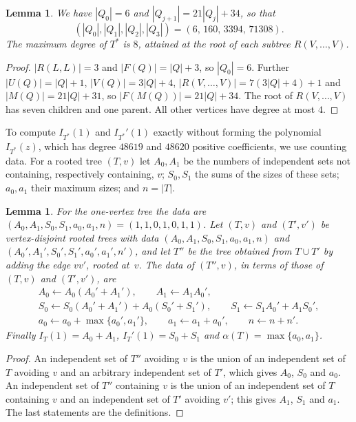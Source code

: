 \documentclass{amsart}
\numberwithin{equation}{section}
\theoremstyle{plain}
\newtheorem{lemma}[theorem]{Lemma}
\theoremstyle{definition}
\theoremstyle{remark}
\begin{document}
\begin{lemma}\label{lem:witnessshape}
We have $|Q_0|=6$ and $|Q_{j+1}|=21|Q_j|+34$, so that
\[
(|Q_0|,|Q_1|,|Q_2|,|Q_3|)=(6,\,160,\,3394,\,71308).
\]
The maximum degree of $T^*$ is $8$, attained at the root of each subtree $R(V,\dots,V)$.
\end{lemma}

\begin{proof}
$|R(L,L)|=3$ and $|F(Q)|=|Q|+3$, so $|Q_0|=6$. Further $|U(Q)|=|Q|+1$, $|V(Q)|=3|Q|+4$, $|R(V,\dots,V)|=7(3|Q|+4)+1$ and $|M(Q)|=21|Q|+31$, so $|F(M(Q))|=21|Q|+34$. The root of $R(V,\dots,V)$ has seven children and one parent. All other vertices have degree at most $4$.
\end{proof}

To compute $I_{T^*}(1)$ and $I_{T^*}'(1)$ exactly without forming the polynomial $I_{T^*}(z)$, which has degree $48619$ and $48620$ positive coefficients, we use counting data. For a rooted tree $(T,v)$ let $A_0,A_1$ be the numbers of independent sets not containing, respectively containing, $v$; $S_0,S_1$ the sums of the sizes of these sets; $a_0,a_1$ their maximum sizes; and $n=|T|$.

\begin{lemma}\label{lem:counting}
For the one-vertex tree the data are $(A_0,A_1,S_0,S_1,a_0,a_1,n)=(1,1,0,1,0,1,1)$. Let $(T,v)$ and $(T',v')$ be vertex-disjoint rooted trees with data $(A_0,A_1,S_0,S_1,a_0,a_1,n)$ and $(A_0',A_1',S_0',S_1',a_0',a_1',n')$, and let $T''$ be the tree obtained from $T\cup T'$ by adding the edge $vv'$, rooted at~$v$. The data of $(T'',v)$, in terms of those of $(T,v)$ and $(T',v')$, are
\begin{equation}\label{eq:counting}
\begin{gathered}
A_0\leftarrow A_0(A_0'+A_1'),\qquad A_1\leftarrow A_1A_0',\\
S_0\leftarrow S_0(A_0'+A_1')+A_0(S_0'+S_1'),\qquad S_1\leftarrow S_1A_0'+A_1S_0',\\
a_0\leftarrow a_0+\max\{a_0',a_1'\},\qquad a_1\leftarrow a_1+a_0',\qquad n\leftarrow n+n'.
\end{gathered}
\end{equation}
Finally $I_T(1)=A_0+A_1$, $I_T'(1)=S_0+S_1$ and $\alpha(T)=\max\{a_0,a_1\}$.
\end{lemma}

\begin{proof}
An independent set of $T''$ avoiding $v$ is the union of an independent set of $T$ avoiding $v$ and an arbitrary independent set of $T'$, which gives $A_0$, $S_0$ and $a_0$. An independent set of $T''$ containing $v$ is the union of an independent set of $T$ containing $v$ and an independent set of $T'$ avoiding $v'$; this gives $A_1$, $S_1$ and $a_1$. The last statements are the definitions.
\end{proof}
\end{document}
